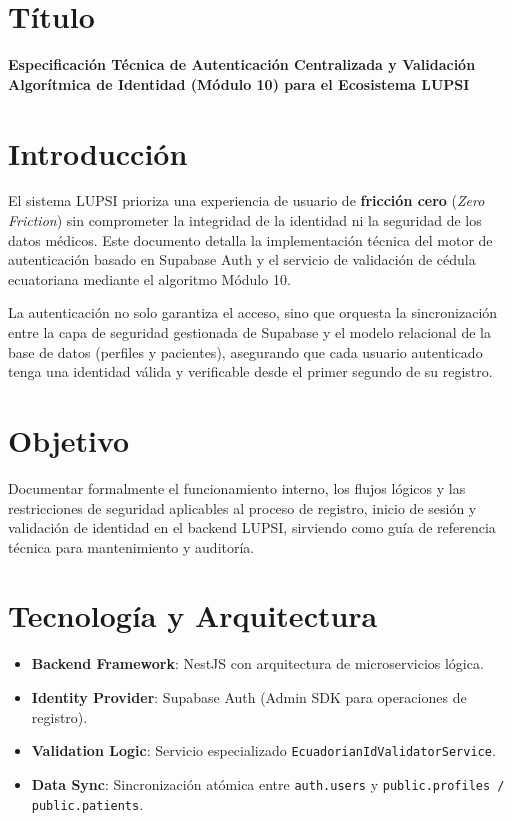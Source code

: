 \documentclass[a4paper,12pt]{article}
\begin{document}
    \raggedbottom

    \section{Título}
    \textbf{Especificación Técnica de Autenticación Centralizada y Validación Algorítmica de Identidad (Módulo 10) para el Ecosistema LUPSI}

    \section{Introducción}
    El sistema LUPSI prioriza una experiencia de usuario de \textbf{fricción cero} (\textit{Zero Friction}) sin comprometer la integridad de la identidad ni la seguridad de los datos médicos. Este documento detalla la implementación técnica del motor de autenticación basado en Supabase Auth y el servicio de validación de cédula ecuatoriana mediante el algoritmo Módulo 10.

    La autenticación no solo garantiza el acceso, sino que orquesta la sincronización entre la capa de seguridad gestionada de Supabase y el modelo relacional de la base de datos (perfiles y pacientes), asegurando que cada usuario autenticado tenga una identidad válida y verificable desde el primer segundo de su registro.

    \section{Objetivo}
    Documentar formalmente el funcionamiento interno, los flujos lógicos y las restricciones de seguridad aplicables al proceso de registro, inicio de sesión y validación de identidad en el backend LUPSI, sirviendo como guía de referencia técnica para mantenimiento y auditoría.

    \section{Tecnología y Arquitectura}

    \begin{itemize}
        \item \textbf{Backend Framework}: NestJS con arquitectura de microservicios lógica.
        \item \textbf{Identity Provider}: Supabase Auth (Admin SDK para operaciones de registro).
        \item \textbf{Validation Logic}: Servicio especializado \texttt{EcuadorianIdValidatorService}.
        \item \textbf{Data Sync}: Sincronización atómica entre \texttt{auth.users} y \texttt{public.profiles / public.patients}.
    \end{itemize}
\end{document}
